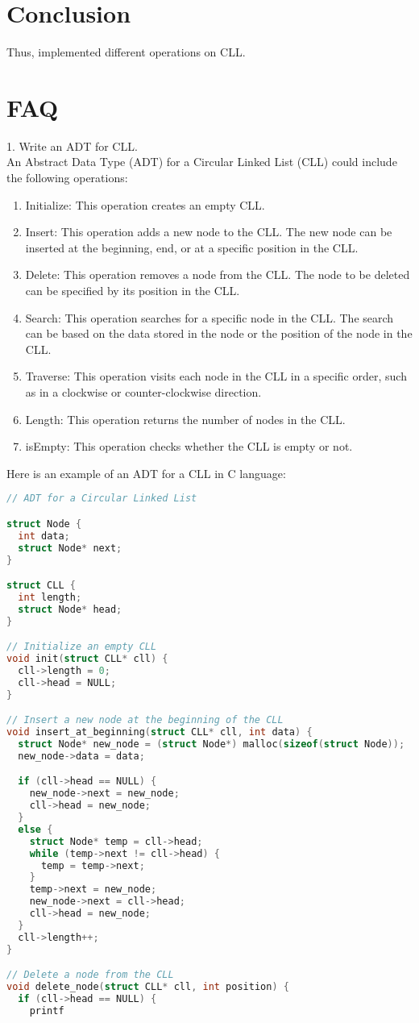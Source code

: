 \documentclass{article}
\begin{document}
\section{\textbf{Conclusion}}
Thus, implemented different operations on CLL.
\section{\textbf{FAQ}}
1. Write an ADT for CLL.\\
An Abstract Data Type (ADT) for a Circular Linked List (CLL) could include the following operations:
\begin{enumerate}
    \item Initialize: This operation creates an empty CLL.
    \item Insert: This operation adds a new node to the CLL. The new node can be inserted at the beginning, end, or at a specific position in the CLL.
    \item Delete: This operation removes a node from the CLL. The node to be deleted can be specified by its position in the CLL.
    \item Search: This operation searches for a specific node in the CLL. The search can be based on the data stored in the node or the position of the node in the CLL.
    \item Traverse: This operation visits each node in the CLL in a specific order, such as in a clockwise or counter-clockwise direction.
    \item Length: This operation returns the number of nodes in the CLL.
    \item isEmpty: This operation checks whether the CLL is empty or not.
\end{enumerate}
Here is an example of an ADT for a CLL in C language:
\begin{lstlisting}[language = c, caption = EXAMPLE]
// ADT for a Circular Linked List

struct Node {
  int data;
  struct Node* next;
}

struct CLL {
  int length;
  struct Node* head;
}

// Initialize an empty CLL
void init(struct CLL* cll) {
  cll->length = 0;
  cll->head = NULL;
}

// Insert a new node at the beginning of the CLL
void insert_at_beginning(struct CLL* cll, int data) {
  struct Node* new_node = (struct Node*) malloc(sizeof(struct Node));
  new_node->data = data;

  if (cll->head == NULL) {
    new_node->next = new_node;
    cll->head = new_node;
  }
  else {
    struct Node* temp = cll->head;
    while (temp->next != cll->head) {
      temp = temp->next;
    }
    temp->next = new_node;
    new_node->next = cll->head;
    cll->head = new_node;
  }
  cll->length++;
}

// Delete a node from the CLL
void delete_node(struct CLL* cll, int position) {
  if (cll->head == NULL) {
    printf

\end{lstlisting}
\end{document}
